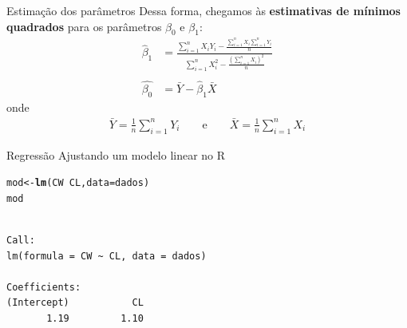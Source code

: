 \documentclass[10pt]{beamer}\usepackage[]{graphicx}\usepackage[]{color}
\makeatletter
\newcommand{\hlopt}[1]{\textcolor[rgb]{0,0,0}{#1}}%
\newcommand{\hlstd}[1]{\textcolor[rgb]{0.345,0.345,0.345}{#1}}%
\newcommand{\hlkwb}[1]{\textcolor[rgb]{0.69,0.353,0.396}{#1}}%
\newcommand{\hlkwc}[1]{\textcolor[rgb]{0.333,0.667,0.333}{#1}}%
\newcommand{\hlkwd}[1]{\textcolor[rgb]{0.737,0.353,0.396}{\textbf{#1}}}%
\newenvironment{kframe}{%
 \def\at@end@of@kframe{}%
 \ifinner\ifhmode%
  \def\at@end@of@kframe{\end{minipage}}%
  \begin{minipage}{\columnwidth}%
 \fi\fi%
 \def\FrameCommand##1{\hskip\@totalleftmargin \hskip-\fboxsep
 \colorbox{shadecolor}{##1}\hskip-\fboxsep
     \hskip-\linewidth \hskip-\@totalleftmargin \hskip\columnwidth}%
 \MakeFramed {\advance\hsize-\width
   \@totalleftmargin\z@ \linewidth\hsize
   \@setminipage}}%
 {\par\unskip\endMakeFramed%
 \at@end@of@kframe}
\newenvironment{knitrout}{}{} %
\providecommand{\R}{\textsf{R}\xspace}
\theoremstyle{definition}
\makeatother
\begin{document}
\begin{frame}[fragile]{Estimação dos parâmetros}
  Dessa forma, chegamos às \textbf{estimativas de mínimos quadrados}
  para os parâmetros $\beta_0$ e $\beta_1$:
  \begin{align*}
    \hat{\beta}_1 &= \frac{\sum_{i=1}^{n} X_iY_i - \frac{\sum_{i=1}^{n}
        X_i \sum_{i=1}^{n} Y_i}{n}}{\sum_{i=1}^{n}X_i^2 -
      \frac{(\sum_{i=1}^{n} X_i)^2}{n}} \\
    & \\
    \hat{\beta_0} &= \bar{Y} - \hat{\beta}_1 \bar{X}
  \end{align*}
  onde
  \begin{align*}
    \bar{Y} = \frac{1}{n} \sum_{i=1}^{n} Y_i \qquad \text{e} \qquad
    \bar{X} = \frac{1}{n} \sum_{i=1}^{n} X_i
  \end{align*}
\end{frame}

\begin{frame}[fragile=singleslide]{Regressão}
Ajustando um modelo linear no \R
\begin{knitrout}\small
{}\color{fgcolor}\begin{kframe}
\begin{alltt}
\hlstd{mod} \hlkwb{<-} \hlkwd{lm}\hlstd{(CW} \hlopt{~} \hlstd{CL,} \hlkwc{data} \hlstd{= dados)}
\hlstd{mod}
\end{alltt}
\begin{verbatim}

Call:
lm(formula = CW ~ CL, data = dados)

Coefficients:
(Intercept)           CL  
       1.19         1.10  
\end{verbatim}
\end{kframe}
\end{knitrout}
\end{frame}
\end{document}
